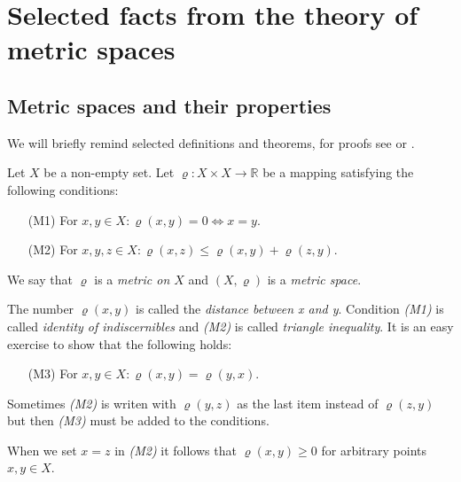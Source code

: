 \chapter{Selected facts from the theory of metric spaces}

\section{Metric spaces and their properties}

We will briefly remind selected definitions and theorems, for proofs see \cite{cech66} or \cite{copson88}.
\begin{define}\label{def:mp}
Let $X$ be a non-empty set. Let $\varrho: X\times X \to \mathbb{R}$ be a mapping satisfying the following conditions:
\begin{enumerate}
	\item[(M1)] For $x,y\in X: \varrho(x,y)=0 \Leftrightarrow x = y$.
	\item[(M2)] For $x,y,z\in X: \varrho(x,z) \le \varrho(x,y) + \varrho(z,y)$.
\end{enumerate}
We say that $\varrho$ is a \emph{metric on $X$} and $(X,\varrho)$ is a \emph{metric space}.
\end{define}
The number $\varrho(x,y)$ is called the \emph{distance between x and y}. Condition \emph{(M1)} is called \emph{identity of indiscernibles} and \emph{(M2)} is called \emph{triangle inequality}.  It is an easy exercise to show that the following holds:
\begin{enumerate}
	\item[(M3)] For $x,y\in X: \varrho(x,y)=\varrho(y,x)$.
\end{enumerate}
Sometimes \emph{(M2)} is writen with $\varrho(y,z)$ as the last item instead of $\varrho(z,y)$ but then \emph{(M3)} must be added to the conditions.

When we set $x=z$ in \emph{(M2)} it follows that $\varrho(x,y)\ge0$ for arbitrary points $x,y\in X$.

